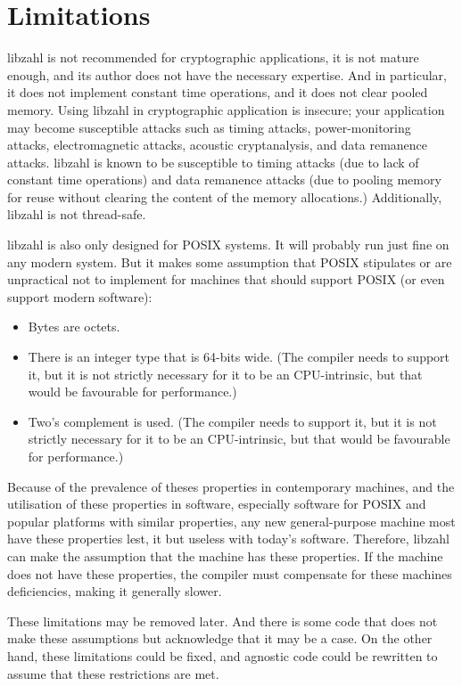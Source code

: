 \newpage
\section{Limitations}
\label{sec:Limitations}

libzahl is not recommended for cryptographic
applications, it is not mature enough, and its
author does not have the necessary expertise.
And in particular, it does not implement constant
time operations, and it does not clear pooled
memory. Using libzahl in cryptographic application
is insecure; your application may become susceptible
attacks such as timing attacks, power-monitoring
attacks, electromagnetic attacks, acoustic
cryptanalysis, and data remanence attacks. libzahl
is known to be susceptible to timing attacks
(due to lack of constant time operations) and
data remanence attacks (due to pooling memory
for reuse without clearing the content of the
memory allocations.) Additionally, libzahl is not
thread-safe.

libzahl is also only designed for POSIX systems.
It will probably run just fine on any modern
system. But it makes some assumption that POSIX
stipulates or are unpractical not to implement
for machines that should support POSIX (or even
support modern software):

\begin{itemize}
\item
Bytes are octets.

\item
There is an integer type that is 64-bits wide.
(The compiler needs to support it, but it is not
strictly necessary for it to be an CPU-intrinsic,
but that would be favourable for performance.)

\item
Two's complement is used.
(The compiler needs to support it, but it is not
strictly necessary for it to be an CPU-intrinsic,
but that would be favourable for performance.)
\end{itemize}

Because of the prevalence of theses properties
in contemporary machines, and the utilisation of
these properties in software, especially software
for POSIX and popular platforms with similar
properties, any new general-purpose machine most
have these properties lest, it but useless with
today's software. Therefore, libzahl can make
the assumption that the machine has these
properties. If the machine does not have these
properties, the compiler must compensate for
these machines deficiencies, making it generally
slower.

These limitations may be removed later. And there
is some code that does not make these assumptions
but acknowledge that it may be a case. On the other
hand, these limitations could be fixed, and agnostic
code could be rewritten to assume that these
restrictions are met.
